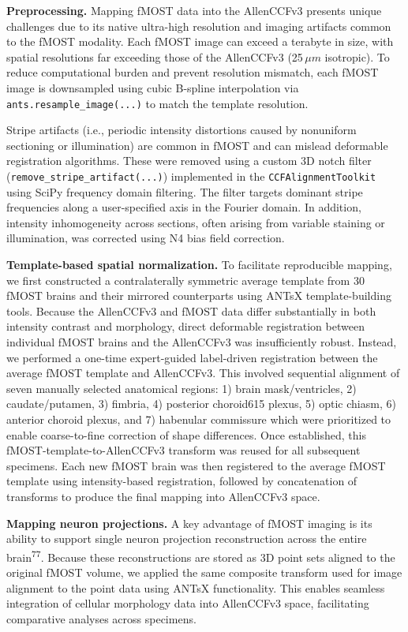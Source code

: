 \documentclass[
  12pt,
]{article}
\begin{document}
\textbf{Preprocessing.} Mapping fMOST data into the AllenCCFv3 presents
unique challenges due to its native ultra-high resolution and imaging
artifacts common to the fMOST modality. Each fMOST image can exceed a
terabyte in size, with spatial resolutions far exceeding those of the
AllenCCFv3 (25\,\(\mu m\) isotropic). To reduce computational burden and
prevent resolution mismatch, each fMOST image is downsampled using cubic
B-spline interpolation via \texttt{ants.resample\_image(...)} to match
the template resolution.

Stripe artifacts (i.e., periodic intensity distortions caused by
nonuniform sectioning or illumination) are common in fMOST and can
mislead deformable registration algorithms. These were removed using a
custom 3D notch filter (\texttt{remove\_stripe\_artifact(...)})
implemented in the \texttt{CCFAlignmentToolkit} using SciPy frequency
domain filtering. The filter targets dominant stripe frequencies along a
user-specified axis in the Fourier domain. In addition, intensity
inhomogeneity across sections, often arising from variable staining or
illumination, was corrected using N4 bias field correction.

\textbf{Template-based spatial normalization.} To facilitate
reproducible mapping, we first constructed a contralaterally symmetric
average template from 30 fMOST brains and their mirrored counterparts
using ANTsX template-building tools. Because the AllenCCFv3 and fMOST
data differ substantially in both intensity contrast and morphology,
direct deformable registration between individual fMOST brains and the
AllenCCFv3 was insufficiently robust. Instead, we performed a one-time
expert-guided label-driven registration between the average fMOST
template and AllenCCFv3. This involved sequential alignment of seven
manually selected anatomical regions: 1) brain mask/ventricles, 2)
caudate/putamen, 3) fimbria, 4) posterior choroid615 plexus, 5) optic
chiasm, 6) anterior choroid plexus, and 7) habenular commissure which
were prioritized to enable coarse-to-fine correction of shape
differences. Once established, this fMOST-template-to-AllenCCFv3
transform was reused for all subsequent specimens. Each new fMOST brain
was then registered to the average fMOST template using intensity-based
registration, followed by concatenation of transforms to produce the
final mapping into AllenCCFv3 space.

\textbf{Mapping neuron projections.} A key advantage of fMOST imaging is
its ability to support single neuron projection reconstruction across
the entire brain\textsuperscript{77}. Because these reconstructions are
stored as 3D point sets aligned to the original fMOST volume, we applied
the same composite transform used for image alignment to the point data
using ANTsX functionality. This enables seamless integration of cellular
morphology data into AllenCCFv3 space, facilitating comparative analyses
across specimens.
\end{document}
